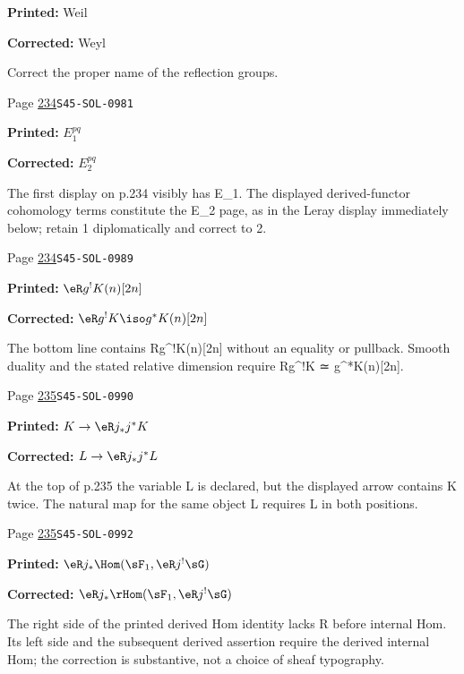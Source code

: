 \begin{description}
\par\noindent\textbf{Printed:} Weil
\par\noindent\textbf{Corrected:} Weyl
\par\noindent Correct the proper name of the reflection groups.
\smallskip
\item[\hypertarget{apparatus:EN-0168}{168}] Page \hyperlink{printpage:en:234}{234}\quad\texttt{S45-SOL-0981}
\par\noindent\textbf{Printed:} \(E_1^{p q}\)
\par\noindent\textbf{Corrected:} \(E_2^{p q}\)
\par\noindent The first display on p.234 visibly has E\_1. The displayed derived-functor cohomology terms constitute the E\_2 page, as in the Leray display immediately below; retain 1 diplomatically and correct to 2.
\smallskip
\item[\hypertarget{apparatus:EN-0169}{169}] Page \hyperlink{printpage:en:234}{234}\quad\texttt{S45-SOL-0989}
\par\noindent\textbf{Printed:} \(\eR g^! K(n)[2 n]\)
\par\noindent\textbf{Corrected:} \(\eR g^! K \iso g^\ast K(n)[2 n]\)
\par\noindent The bottom line contains Rg\textasciicircum{}!K(n)[2n] without an equality or pullback. Smooth duality and the stated relative dimension require Rg\textasciicircum{}!K ≃ g\textasciicircum{}*K(n)[2n].
\smallskip
\item[\hypertarget{apparatus:EN-0170}{170}] Page \hyperlink{printpage:en:235}{235}\quad\texttt{S45-SOL-0990}
\par\noindent\textbf{Printed:} \(K\to \eR j_\ast j^\ast K\)
\par\noindent\textbf{Corrected:} \(L\to \eR j_\ast j^\ast L\)
\par\noindent At the top of p.235 the variable L is declared, but the displayed arrow contains K twice. The natural map for the same object L requires L in both positions.
\smallskip
\item[\hypertarget{apparatus:EN-0171}{171}] Page \hyperlink{printpage:en:235}{235}\quad\texttt{S45-SOL-0992}
\par\noindent\textbf{Printed:} \(\eR j_\ast \Hom(\sF_1,\eR j^! \sG)\)
\par\noindent\textbf{Corrected:} \(\eR j_\ast \rHom(\sF_1,\eR j^! \sG)\)
\par\noindent The right side of the printed derived Hom identity lacks R before internal Hom. Its left side and the subsequent derived assertion require the derived internal Hom; the correction is substantive, not a choice of sheaf typography.

\end{description}
